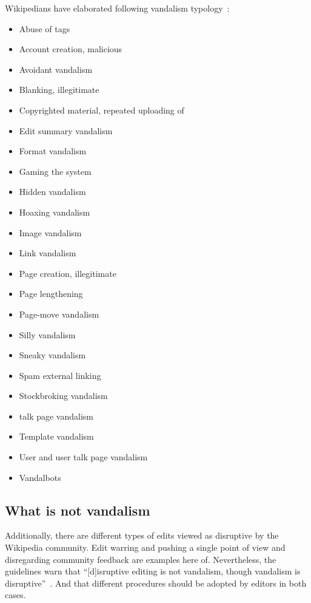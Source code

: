 Wikipedians have elaborated following vandalism typology~\cite{Wikipedia:Vandalism}:
\begin{itemize}
    \item  Abuse of tags
    \item  Account creation, malicious
    \item  Avoidant vandalism
    \item  Blanking, illegitimate
    \item  Copyrighted material, repeated uploading of
    \item  Edit summary vandalism
    \item  Format vandalism
    \item  Gaming the system
    \item  Hidden vandalism
    \item  Hoaxing vandalism
    \item  Image vandalism
    \item  Link vandalism
    \item  Page creation, illegitimate
    \item  Page lengthening
    \item  Page-move vandalism
    \item  Silly vandalism
    \item  Sneaky vandalism
    \item  Spam external linking
    \item  Stockbroking vandalism
    \item  talk page vandalism
    \item  Template vandalism
    \item  User and user talk page vandalism
    \item  Vandalbots
\end{itemize}

\subsection{What is not vandalism}

Additionally, there are different types of edits viewed as disruptive by the Wikipedia community.
Edit warring and pushing a single point of view and disregarding community feedback are examples here of. %
Nevertheless, the guidelines warn that ``[d]isruptive editing is not vandalism, though vandalism is disruptive''~\cite{Wikipedia:DisruptiveEditing}.
And that different procedures should be adopted by editors in both cases.

